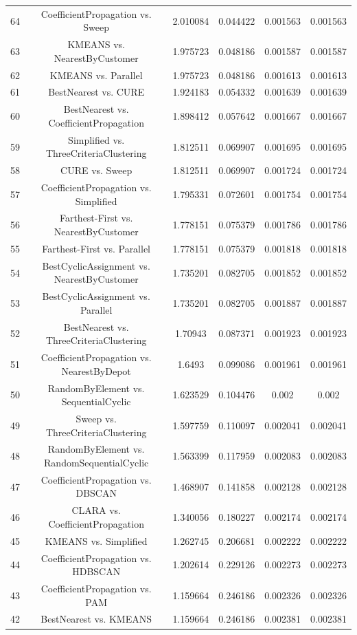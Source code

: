 \documentclass[a4paper,10pt]{article}
\begin{document}
\begin{landscape}
\begin{table}[!htp]
\begin{tabular}{cccccc}
64&CoefficientPropagation vs. Sweep&2.010084&0.044422&0.001563&0.001563\\
63&KMEANS vs. NearestByCustomer&1.975723&0.048186&0.001587&0.001587\\
62&KMEANS vs. Parallel&1.975723&0.048186&0.001613&0.001613\\
61&BestNearest vs. CURE&1.924183&0.054332&0.001639&0.001639\\
60&BestNearest vs. CoefficientPropagation&1.898412&0.057642&0.001667&0.001667\\
59&Simplified vs. ThreeCriteriaClustering&1.812511&0.069907&0.001695&0.001695\\
58&CURE vs. Sweep&1.812511&0.069907&0.001724&0.001724\\
57&CoefficientPropagation vs. Simplified&1.795331&0.072601&0.001754&0.001754\\
56&Farthest-First vs. NearestByCustomer&1.778151&0.075379&0.001786&0.001786\\
55&Farthest-First vs. Parallel&1.778151&0.075379&0.001818&0.001818\\
54&BestCyclicAssignment vs. NearestByCustomer&1.735201&0.082705&0.001852&0.001852\\
53&BestCyclicAssignment vs. Parallel&1.735201&0.082705&0.001887&0.001887\\
52&BestNearest vs. ThreeCriteriaClustering&1.70943&0.087371&0.001923&0.001923\\
51&CoefficientPropagation vs. NearestByDepot&1.6493&0.099086&0.001961&0.001961\\
50&RandomByElement vs. SequentialCyclic&1.623529&0.104476&0.002&0.002\\
49&Sweep vs. ThreeCriteriaClustering&1.597759&0.110097&0.002041&0.002041\\
48&RandomByElement vs. RandomSequentialCyclic&1.563399&0.117959&0.002083&0.002083\\
47&CoefficientPropagation vs. DBSCAN&1.468907&0.141858&0.002128&0.002128\\
46&CLARA vs. CoefficientPropagation&1.340056&0.180227&0.002174&0.002174\\
45&KMEANS vs. Simplified&1.262745&0.206681&0.002222&0.002222\\
44&CoefficientPropagation vs. HDBSCAN&1.202614&0.229126&0.002273&0.002273\\
43&CoefficientPropagation vs. PAM&1.159664&0.246186&0.002326&0.002326\\
42&BestNearest vs. KMEANS&1.159664&0.246186&0.002381&0.002381\\

\end{tabular}
\end{table}
\end{landscape}
\end{document}
